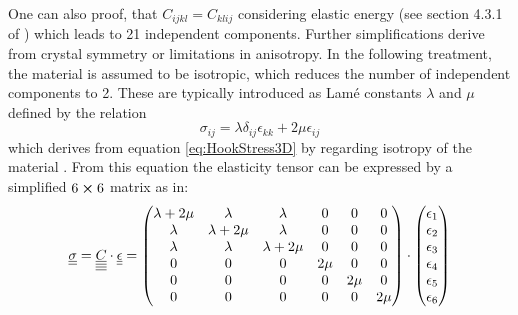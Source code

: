 One can also proof, that $C_{ijkl} = C_{klij}$ considering elastic energy (see
section 4.3.1 of \cite{GrossMarx2014}) which leads to 21 independent
components. Further simplifications derive from crystal symmetry or
limitations in anisotropy. In the following treatment, the material is assumed
to be isotropic, which reduces the number of independent components to 2. These
are typically introduced as Lamé constants $\lambda$ and $\mu$ defined by the
relation
\begin{equation} \label{eq:StressStrainIso_tensor}
    \sigma_{ij} = \lambda \delta_{ij} \epsilon_{kk} + 2\mu \epsilon_{ij}
\end{equation}
which derives from equation \ref{eq:HookStress3D} by regarding isotropy of the
material \cite{kundu2012ultrasonic}. From this equation the elasticity tensor
can be expressed by a simplified $6\cross6$ matrix as in:
\begin{equation} \label{eq:StressStrainIso}
    \underline{\underline{\sigma}} = \underline{\underline{\underline{\underline{C}}}}\cdot \underline{\underline{\epsilon}} =
    \begin{pmatrix}
        \lambda + 2\mu & \lambda        & \lambda        & 0    & 0    & 0
        \\
        \lambda        & \lambda + 2\mu & \lambda        & 0    & 0    & 0
        \\
        \lambda        & \lambda        & \lambda + 2\mu & 0    & 0    & 0
        \\
        0              & 0              & 0              & 2\mu & 0    & 0
        \\
        0              & 0              & 0              & 0    & 2\mu & 0
        \\
        0              & 0              & 0              & 0    & 0    & 2\mu
        \\
    \end{pmatrix}
    \cdot
    \begin{pmatrix}
        \epsilon_1 \\ \epsilon_2 \\ \epsilon_3 \\ \epsilon_4 \\ \epsilon_5 \\
        \epsilon_6 \\
    \end{pmatrix}
\end{equation}

